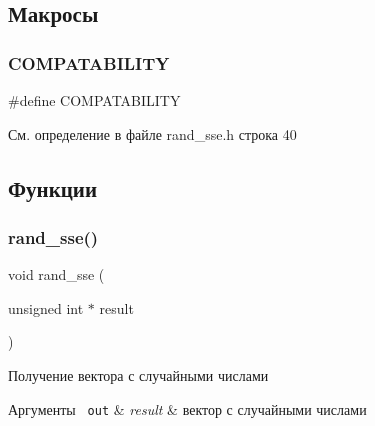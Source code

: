 \subsection{Макросы}
\mbox{\label{group__rand__sseh_ga63986cff5b50815b213aa8d6a9ab8768}} 
\subsubsection{\texorpdfstring{COMPATABILITY}{COMPATABILITY}}
{\footnotesize\ttfamily \#define C\+O\+M\+P\+A\+T\+A\+B\+I\+L\+I\+TY}



См. определение в файле rand\+\_\+sse.\+h строка 40



\subsection{Функции}
\mbox{\label{group__rand__sseh_gab7ae3ab6c8fb3e31548413dd0154db7d}} 
\subsubsection{\texorpdfstring{rand\_sse()}{rand\_sse()}}
{\footnotesize\ttfamily void rand\+\_\+sse (\begin{DoxyParamCaption}\item[{unsigned int $\ast$}]{result }\end{DoxyParamCaption})}



Получение вектора с случайными числами 


\begin{DoxyCode}{0}
\end{DoxyCode}
 
\begin{DoxyParams}[1]{Аргументы}
\mbox{\texttt{ out}}  & {\em result} & вектор с случайными числами \\
\hline
\end{DoxyParams}


